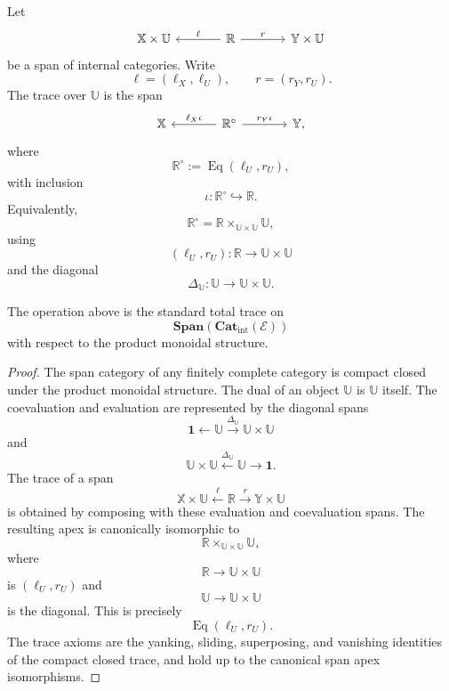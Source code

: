 Let
\[
\begin{tikzcd}[column sep=large]
\mathbb X\times\mathbb U
&
\mathbb R
  \arrow[l, "\ell"']
  \arrow[r, "r"]
&
\mathbb Y\times\mathbb U
\end{tikzcd}
\]
be a span of internal categories.  Write
\[
\ell=(\ell_X,\ell_U),
\qquad
r=(r_Y,r_U).
\]
The trace over \(\mathbb U\) is the span
\[
\begin{tikzcd}[column sep=large]
\mathbb X
&
\mathbb R^\circ
  \arrow[l, "\ell_X\iota"']
  \arrow[r, "r_Y\iota"]
&
\mathbb Y,
\end{tikzcd}
\]
where
\[
\mathbb R^\circ
:=
\operatorname{Eq}(\ell_U,r_U),
\]
with inclusion
\[
\iota:\mathbb R^\circ\hookrightarrow\mathbb R.
\]
Equivalently,
\[
\mathbb R^\circ
=
\mathbb R\times_{\mathbb U\times\mathbb U}\mathbb U,
\]
using
\[
(\ell_U,r_U):\mathbb R\to\mathbb U\times\mathbb U
\]
and the diagonal
\[
\Delta_{\mathbb U}:\mathbb U\to\mathbb U\times\mathbb U.
\]

\begin{proposition}
\label{prop:ambient-span-total-trace}
The operation above is the standard total trace on
\[
\mathbf{Span}(\mathbf{Cat}_{\mathrm{int}}(\mathcal E))
\]
with respect to the product monoidal structure.
\end{proposition}

\begin{proof}
The span category of any finitely complete category is compact closed under
the product monoidal structure.  The dual of an object \(\mathbb U\) is
\(\mathbb U\) itself.  The coevaluation and evaluation are represented by the
diagonal spans
\[
\mathbf 1
\longleftarrow
\mathbb U
\xrightarrow{\Delta_{\mathbb U}}
\mathbb U\times\mathbb U
\]
and
\[
\mathbb U\times\mathbb U
\xleftarrow{\Delta_{\mathbb U}}
\mathbb U
\longrightarrow
\mathbf 1.
\]
The trace of a span
\[
\mathbb X\times\mathbb U
\xleftarrow{\ell}
\mathbb R
\xrightarrow{r}
\mathbb Y\times\mathbb U
\]
is obtained by composing with these evaluation and coevaluation spans.  The
resulting apex is canonically isomorphic to
\[
\mathbb R\times_{\mathbb U\times\mathbb U}\mathbb U,
\]
where
\[
\mathbb R\to\mathbb U\times\mathbb U
\]
is \((\ell_U,r_U)\) and
\[
\mathbb U\to\mathbb U\times\mathbb U
\]
is the diagonal.  This is precisely
\[
\operatorname{Eq}(\ell_U,r_U).
\]
The trace axioms are the yanking, sliding, superposing, and vanishing
identities of the compact closed trace, and hold up to the canonical span apex
isomorphisms.
\end{proof}

